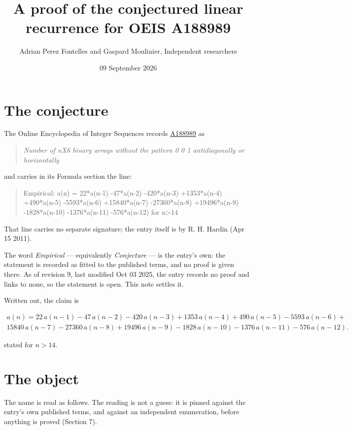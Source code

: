 \documentclass[11pt]{article}
\title{A proof of the conjectured linear recurrence for OEIS A188989}
\author{Adrian Perez Fontelles and Gaspard Moulinier, Independent researchers}
\date{09 September 2026}
\theoremstyle{definition}
\begin{document}
\maketitle
\section{The conjecture}

The Online Encyclopedia of Integer Sequences records \href{https://oeis.org/A188989}{A188989} as

\begin{quote}\itshape Number of nX6 binary arrays without the pattern 0 0 1 antidiagonally or horizontally\end{quote}

and carries in its Formula section the line:

\begin{quote}\ttfamily Empirical: a(n) = 22*a(n-1) -47*a(n-2) -420*a(n-3) +1353*a(n-4) +490*a(n-5) -5593*a(n-6) +15840*a(n-7) -27360*a(n-8) +19496*a(n-9) -1828*a(n-10) -1376*a(n-11) -576*a(n-12) for n>14\end{quote}

That line carries no separate signature; the entry itself is by R. H. Hardin (Apr 15 2011).

The word {\itshape Empirical} --- equivalently {\itshape Conjecture} --- is the entry's own: the statement is recorded as fitted to the published terms, and no proof is given there. As of revision 9, last modified Oct 03 2025, the entry records no proof and links to none, so the statement is open. This note settles it.

Written out, the claim is

\begin{multline*} a(n) = 22\,a(n-1) - 47\,a(n-2) - 420\,a(n-3) + 1353\,a(n-4) + 490\,a(n-5) - 5593\,a(n-6) + \\ 15840\,a(n-7) - 27360\,a(n-8) + 19496\,a(n-9) - 1828\,a(n-10) - 1376\,a(n-11) - 576\,a(n-12). \end{multline*}

stated for $n > 14$.

\section{The object}

The name is read as follows. The reading is not a guess: it is pinned against the entry's own published terms, and against an independent enumeration, before anything is proved (Section 7).
\end{document}
